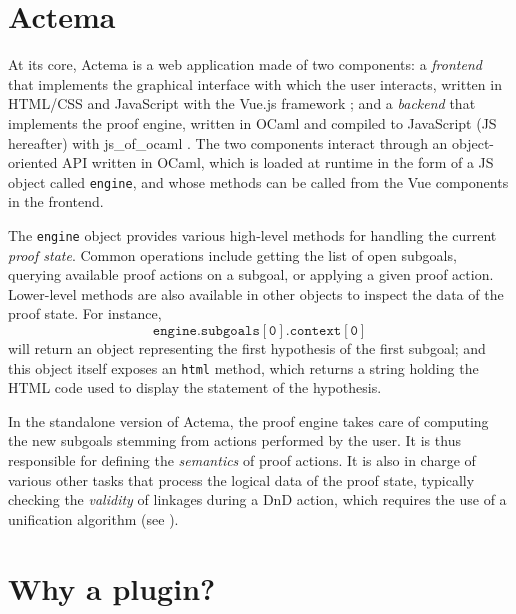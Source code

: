 \section{Actema}

At its core, Actema is a web application made of two components: a
\emph{frontend} that implements the graphical interface with which the user
interacts, written in HTML/CSS and JavaScript with the Vue.js framework
; and a \emph{backend} that implements the proof engine, written in
OCaml and compiled to JavaScript (JS hereafter) with js\_of\_ocaml
. The two components interact through an
object-oriented API written in OCaml, which is loaded at runtime in the form of
a JS object called \texttt{engine}, and whose methods can be called from the Vue
components in the frontend.

The \texttt{engine} object provides various high-level methods for handling the
current \emph{proof state}. Common operations include getting the list of open
subgoals, querying available proof actions on a subgoal, or applying a given
proof action. Lower-level methods are also available in other objects to inspect
the data of the proof state. For instance,
$$\mathtt{engine.subgoals[0].context[0]}$$
will return an object representing the first hypothesis of the first subgoal;
and this object itself exposes an \texttt{html} method, which returns a string
holding the HTML code used to display the statement of the hypothesis.


In the standalone version of Actema, the proof engine takes care of computing
the new subgoals stemming from actions performed by the user. It is thus
responsible for defining the \emph{semantics} of proof actions. It is also in
charge of various other tasks that process the logical data of the proof state,
typically checking the \emph{validity} of linkages during a DnD action, which
requires the use of a unification algorithm (see ).

\section{Why a plugin?}

